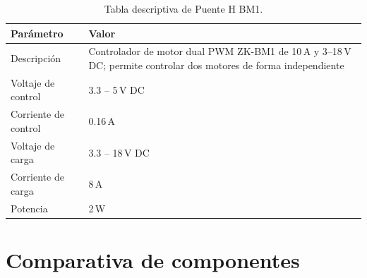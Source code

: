 \begin{table}[H]
\centering
\caption{Tabla descriptiva de Puente H BM1.}
\label{tab:tc_puente_h_bm1}
\renewcommand{\arraystretch}{1.3}
\small
\begin{tabularx}{\textwidth}{@{} l X @{}}
\toprule
\textbf{Parámetro} & \textbf{Valor} \\
\midrule
Descripción & Controlador de motor dual PWM ZK-BM1 de 10\,A y 3--18\,V DC; permite controlar dos motores de forma independiente \\
Voltaje de control & 3.3 -- 5\,V DC \\
Corriente de control & 0.16\,A \\
Voltaje de carga & 3.3 -- 18\,V DC \\
Corriente de carga & 8\,A \\
Potencia & 2\,W \\
\bottomrule
\end{tabularx}
\end{table}

\section*{Comparativa de componentes}

\begin{table}[H]
\centering
\caption{Tabla comparativa de fuentes de alimentación a 12\,V.}
\label{tab:cmp_fuentes_12v}
\renewcommand{\arraystretch}{1.3}
\small
{}
\end{table}

